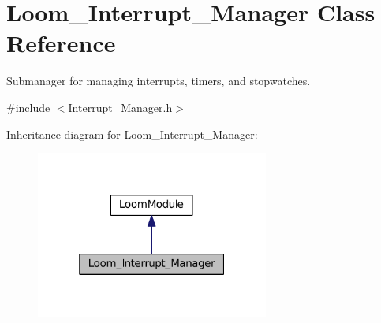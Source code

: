 \hypertarget{class_loom___interrupt___manager}{}\section{Loom\+\_\+\+Interrupt\+\_\+\+Manager Class Reference}
\label{class_loom___interrupt___manager}


Submanager for managing interrupts, timers, and stopwatches.  




{\ttfamily \#include $<$Interrupt\+\_\+\+Manager.\+h$>$}



Inheritance diagram for Loom\+\_\+\+Interrupt\+\_\+\+Manager\+:\nopagebreak
\begin{figure}[H]
\begin{center}
\leavevmode
\includegraphics[width=217pt]{class_loom___interrupt___manager__inherit__graph}
\end{center}
\end{figure}
